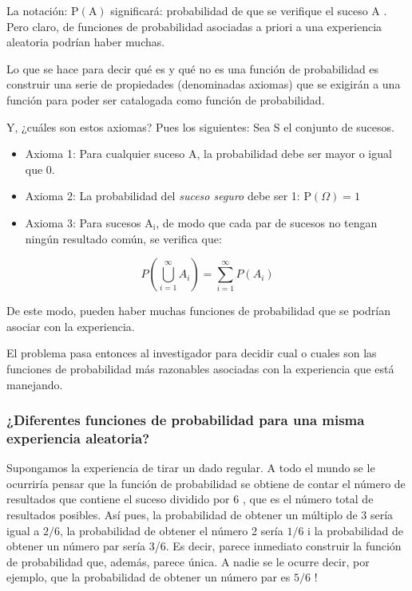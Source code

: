 \documentclass[
]{article}
\begin{document}
La notación: \(\mathrm{P}(\mathrm{A})\) significará: probabilidad de que
se verifique el suceso A . Pero claro, de funciones de probabilidad
asociadas a priori a una experiencia aleatoria podrían haber muchas.

Lo que se hace para decir qué es y qué no es una función de probabilidad
es construir una serie de propiedades (denominadas axiomas) que se
exigirán a una función para poder ser catalogada como función de
probabilidad.

Y, ¿cuáles son estos axiomas? Pues los siguientes: Sea S el conjunto de
sucesos.

\begin{itemize}
\item
  Axioma 1: Para cualquier suceso A, la probabilidad debe ser
  mayor o igual que 0.
\item
  Axioma 2: La probabilidad del \emph{suceso seguro} debe ser 1: \(\mathrm{P}(\Omega)=1\)
\item
  Axioma 3: Para sucesos \(\mathrm{A}_{\mathrm{i}}\), de modo que cada par de sucesos no
  tengan ningún resultado común, se verifica que:
\end{itemize}

\[
P\left(\bigcup_{i=1}^{\infty} A_{i}\right)=\sum_{i=1}^{\infty} P\left(A_{i}\right)
\]

De este modo, pueden haber muchas funciones de probabilidad que se
podrían asociar con la experiencia.

El problema pasa entonces al investigador para decidir cual o cuales son
las funciones de probabilidad más razonables asociadas con la
experiencia que está manejando.

\subsubsection{¿Diferentes funciones de probabilidad para una misma experiencia aleatoria?}\label{diferentes-funciones-de-probabilidad-para-una-misma-experiencia-aleatoria}

Supongamos la experiencia de tirar un dado regular. A todo el mundo se
le ocurriría pensar que la función de probabilidad se obtiene de contar
el número de resultados que contiene el suceso dividido por 6 , que es
el número total de resultados posibles. Así pues, la probabilidad de
obtener un múltiplo de 3 sería igual a \(2 / 6\), la probabilidad de
obtener el número 2 sería \(1 / 6\) i la probabilidad de obtener un número
par sería 3/6. Es decir, parece inmediato construir la función de
probabilidad que, además, parece única. A nadie se le ocurre decir, por
ejemplo, que la probabilidad de obtener un número par es \(5 / 6\) !
\end{document}
